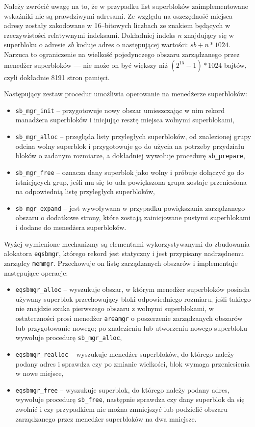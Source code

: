 \documentclass[12pt,a4paper,titlepage,twoside]{mwart}
\begin{document}
Należy zwrócić uwagę na to, że w przypadku list superbloków zaimplementowane
wskaźniki nie są prawdziwymi adresami. Ze względu na oszczędność miejsca adresy
zostały zakodowane w 16--bitowych liczbach ze znakiem będących w rzeczywistości
relatywnymi indeksami. Dokładniej indeks $n$ znajdujący się w superbloku o
adresie $sb$ koduje adres o następującej wartości: $sb + n * 1024$. Narzuca to
ograniczenie na wielkość pojedynczego obszaru zarządzanego przez menedżer
superbloków --- nie może on być większy niż $(2^{15} - 1) * 1024$ bajtów, czyli
dokładnie 8191 stron pamięci.

Następujący zestaw procedur umożliwia operowanie na menedżerze superbloków:
\begin{itemize}
\item \verb+sb_mgr_init+ -- przygotowuje nowy obszar umieszczając w nim rekord
manadżera superbloków i inicjując resztę miejsca wolnymi superblokami,
\item \verb+sb_mgr_alloc+ -- przegląda listy przyległych superbloków, od
znalezionej grupy odcina wolny superblok i przygotowuje go do użycia na
potrzeby przydziału bloków o zadanym rozmiarze, a dokładniej wywołuje procedurę
\verb+sb_prepare+,
\item \verb+sb_mgr_free+ -- oznacza dany superblok jako wolny i próbuje
dołączyć go do istniejących grup, jeśli mu się to uda powiększona grupa zostaje
przeniesiona na odpowiednią listę przyległych superbloków,
\item \verb+sb_mgr_expand+ -- jest wywoływana w przypadku powiększania
zarządzanego obszaru o dodatkowe strony, które zostają zainicjowane pustymi
superblokami i dodane do menedżera superbloków.
\end{itemize}

Wyżej wymienione mechanizmy są elementami wykorzystywanymi do zbudowania
alokatora \texttt{eqsbmgr}, którego rekord jest statyczny i jest przypisany
nadrzędnemu zarządcy \texttt{memmgr}. Przechowuje on listę zarządzanych
obszarów i implementuje następujące operacje:

\begin{itemize}
\item \verb+eqsbmgr_alloc+ -- wyszukuje obszar, w którym menedżer superbloków
posiada używany superblok przechowujący bloki odpowiedniego rozmiaru, jeśli
takiego nie znajdzie szuka pierwszego obszaru z wolnymi superblokami, w
ostateczności prosi menedżer \texttt{areamgr} o poszerzenie zarządzanych
obszarów lub przygotowanie nowego; po znalezieniu lub utworzeniu nowego
superbloku wywołuje procedurę \verb+sb_mgr_alloc+,
\item \verb+eqsbmgr_realloc+ -- wyszukuje menedżer superbloków, do którego
należy podany adres i sprawdza czy po zmianie wielkości, blok wymaga
przeniesienia w nowe miejsce,
\item \verb+eqsbmgr_free+ -- wyszukuje superblok, do którego należy
podany adres, wywołuje procedurę \verb+sb_free+, następnie sprawdza czy dany
superblok da się zwolnić i czy przypadkiem nie można zmniejszyć lub podzielić
obszaru zarządzanego przez menedżer superbloków na dwa mniejsze.
\end{itemize}
\end{document}
